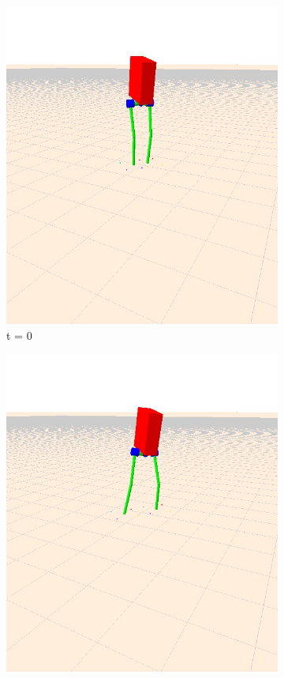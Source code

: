 \documentclass[letterpaper, 10 pt, conference]{ieeeconf}  %
\begin{document}
\begin{figure}[tbp]
  \centering
  \begin{subfigure}[b]{0.3\textwidth}
    \centering
    \includegraphics[width=\textwidth] {figures/balanceNoYaw1.jpg}
    \caption{t = 0}
    \label{fig:balanceNoYaw1}
  \end{subfigure}\hfill
  \begin{subfigure}[b]{0.3\textwidth}
    \centering
    \includegraphics[width=\textwidth] {figures/balanceNoYaw2.jpg} 

\end{subfigure}
\end{figure}
\end{document}
